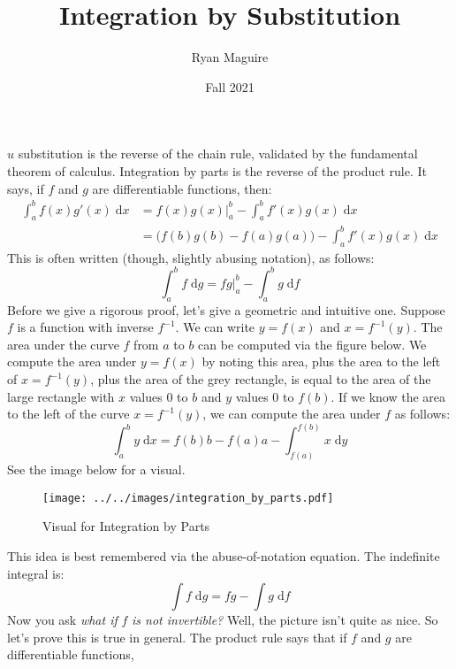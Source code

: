 \documentclass{article}
\title{Integration by Substitution}
\author{Ryan Maguire}
\date{Fall 2021}
\theoremstyle{normal}
\theoremstyle{plain}
\begin{document}
    \maketitle
    $u$ substitution is the reverse of the chain rule, validated by the
    fundamental theorem of calculus. Integration by parts is the reverse of the
    product rule. It says, if $f$ and $g$ are differentiable functions, then:
    \begin{align}
        \int_{a}^{b}f(x)g'(x)\;\textrm{d}x
            &=f(x)g(x)\big|_{a}^{b}-\int_{a}^{b}f'(x)g(x)\;\textrm{d}x\\
            &=\Big(f(b)g(b)-f(a)g(a)\Big)-\int_{a}^{b}f'(x)g(x)\;\textrm{d}x
    \end{align}
    This is often written (though, slightly abusing notation), as follows:
    \begin{equation}
        \int_{a}^{b}f\;\textrm{d}g=fg\big|_{a}^{b}-\int_{a}^{b}g\;\textrm{d}f
    \end{equation}
    Before we give a rigorous proof, let's give a geometric and intuitive one.
    Suppose $f$ is a function with inverse $f^{-1}$. We can write
    $y=f(x)$ and $x=f^{-1}(y)$. The area under the curve $f$ from $a$ to $b$
    can be computed via the figure below. We compute the area under $y=f(x)$
    by noting this area, plus the area to the left of $x=f^{-1}(y)$, plus the
    area of the grey rectangle, is equal to the area of the large rectangle
    with $x$ values 0 to $b$ and $y$ values 0 to $f(b)$. If we know the area to
    the left of the curve $x=f^{-1}(y)$, we can compute the area under $f$ as
    follows:
    \begin{equation}
        \int_{a}^{b}y\;\textrm{d}x
            =f(b)b-f(a)a-\int_{f(a)}^{f(b)}x\;\textrm{d}y
    \end{equation}
    See the image below for a visual.
    \begin{figure}[H]
        \centering
        \texttt{[image: ../../images/integration\_by\_parts.pdf]}
        \caption{Visual for Integration by Parts}
    \end{figure}
    This idea is best remembered via the abuse-of-notation equation. The
    indefinite integral is:
    \begin{equation}
        \int{f}\;\textrm{d}g=fg-\int{g}\;\textrm{d}f
    \end{equation}
    Now you ask \textit{what if} $f$ \textit{is not invertible?} Well, the
    picture isn't quite as nice. So let's prove this is true in general.
    The product rule says that if $f$ and $g$ are differentiable functions,
\end{document}

